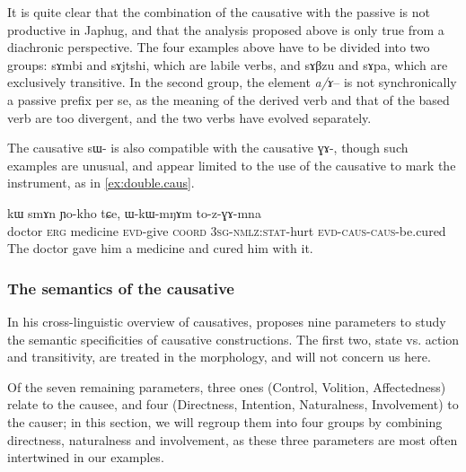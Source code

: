 \documentclass[oldfontcommands,oneside,a4paper,11pt]{memoir}
\newcommand{\ipa}[1]{{\phon #1}} %
\newcommand{\wav}[1]{}%
\newcommand{\caus}{\textsc{caus}}
\newcommand{\coord}{\textsc{coord}}
\newcommand{\erg}{\textsc{erg}}
\newcommand{\evd}{\textsc{evd}}
\newcommand{\nmlz}{\textsc{nmlz}}
\newcommand{\sg}{\textsc{sg}}
\newcommand{\stat}{\textsc{stat}}
\begin{document}
It is quite clear that the combination of the causative with the passive is not productive in Japhug, and that the analysis proposed above is only true from a diachronic perspective. The four examples above have to be divided into two groups:   \ipa{sɤmbi} and \ipa{sɤjtshi}, which are labile verbs, and \ipa{sɤβzu} and \ipa{sɤpa}, which are exclusively transitive. In the second group,  the element \textit{a/ɤ}-- is not synchronically a passive prefix per se, as the meaning of the derived verb and that of the based verb are too divergent, and the two verbs have evolved separately.


The causative \ipa{sɯ-} is also compatible with the causative \ipa{ɣɤ-}, though such examples are unusual, and appear limited to the use of  the causative to mark the instrument, as in \ref{ex:double.caus}.
 \begin{exe}
\ex  \label{ex:double.caus}
\gll \ipa{smɤnba} 	\ipa{kɯ} 	\ipa{smɤn} 	\ipa{ɲo-kho} 	\ipa{tɕe,} 	\ipa{ɯ-kɯ-mŋɤm} 	\ipa{to-z-ɣɤ-mna}    \\
  doctor \erg{} medicine \evd{}-give \coord{} 3\sg{}-\nmlz{}:\stat{}-hurt \evd{}-\caus{}-\caus{}-be.cured \\
\glt The doctor gave him a medicine and cured him with it. \wav{8_zGAmna}
\end{exe}
 




 
 



\subsubsection{The semantics of the causative } \label{subsub:caus.semantics}
In his cross-linguistic overview of causatives, \citet[62-68]{dixon00causative} proposes nine parameters to study the semantic specificities of causative constructions. The first two, state vs. action and transitivity, are treated in the morphology, and will not concern us here. 

Of the seven remaining parameters, three ones (Control, Volition, Affectedness) relate to the causee, and four (Directness, Intention, Naturalness, Involvement) to the causer; in this section, we will regroup them into four groups by combining directness, naturalness and involvement, as these three parameters are most often intertwined in our examples.
\end{document}
